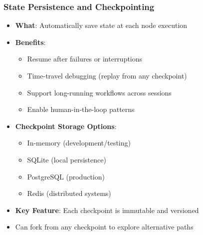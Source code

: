 \begin{frame}[fragile]\frametitle{State Persistence and Checkpointing}
      \begin{itemize}
        \item \textbf{What}: Automatically save state at each node execution
        \item \textbf{Benefits}:
        \begin{itemize}
            \item Resume after failures or interruptions
            \item Time-travel debugging (replay from any checkpoint)
            \item Support long-running workflows across sessions
            \item Enable human-in-the-loop patterns
        \end{itemize}
        \item \textbf{Checkpoint Storage Options}:
        \begin{itemize}
            \item In-memory (development/testing)
            \item SQLite (local persistence)
            \item PostgreSQL (production)
            \item Redis (distributed systems)
        \end{itemize}
        \item \textbf{Key Feature}: Each checkpoint is immutable and versioned
        \item Can fork from any checkpoint to explore alternative paths
      \end{itemize}
	  

\end{frame}
